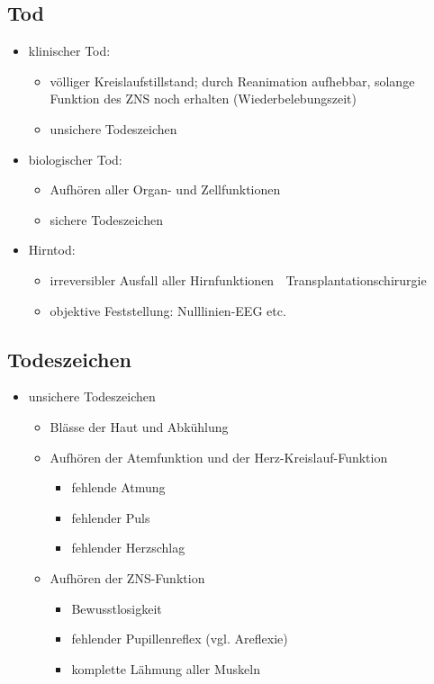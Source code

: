 \begin{it>emize}
\subsection{Tod}
\begin{itemize}
\item klinischer Tod:
\begin{itemize}
\item völliger Kreislaufstillstand; durch Reanimation aufhebbar, solange Funktion des ZNS noch erhalten (Wiederbelebungszeit)
\item unsichere Todeszeichen
\end{itemize}
\item biologischer Tod:
\begin{itemize}
\item Aufhören aller Organ- und Zellfunktionen
\item sichere Todeszeichen
\end{itemize}
\item Hirntod:
\begin{itemize}
\item irreversibler Ausfall aller Hirnfunktionen    Transplantationschirurgie
\item objektive Feststellung: Nulllinien-EEG etc.
\end{itemize}
\end{itemize}

\subsection{Todeszeichen}
\begin{itemize}
\item unsichere Todeszeichen
\begin{itemize}
\item Blässe der Haut und Abkühlung
\item Aufhören der Atemfunktion und der Herz-Kreislauf-Funktion
\begin{itemize}
\item fehlende Atmung
\item fehlender Puls
\item fehlender Herzschlag
\end{itemize}
\item Aufhören der ZNS-Funktion
\begin{itemize}
\item Bewusstlosigkeit
\item fehlender Pupillenreflex (vgl. Areflexie)
\item komplette Lähmung aller Muskeln
\end{itemize}
\end{itemize}
\end{itemize}


\end{it>emize}
